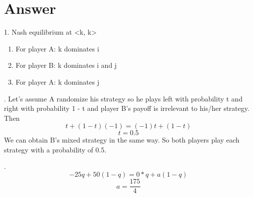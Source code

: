 \documentclass[11pt]{article}
\begin{document}
\section{Answer}
1. Nash equilibrium at <k, k>
\begin{enumerate}
  \item For player A: k dominates i
  \item For player B: k dominates i and j
  \item For player A: k dominates j
\end{enumerate}

. Let's assume A randomize his strategy so he plays left with probability t and right with probability 1 - t and player B's payoff is irrelevant to his/her strategy. Then
$$t + (1-t)(-1) = (-1)t + (1-t)$$
$$t = 0.5$$
We can obtain B's mixed strategy in the same way.
So both players play each strategy with a probability of 0.5.

. 
$$-25q + 50(1-q) = 0 * q + a(1-q)$$
$$a = \frac{175}{4}$$
\end{document}
